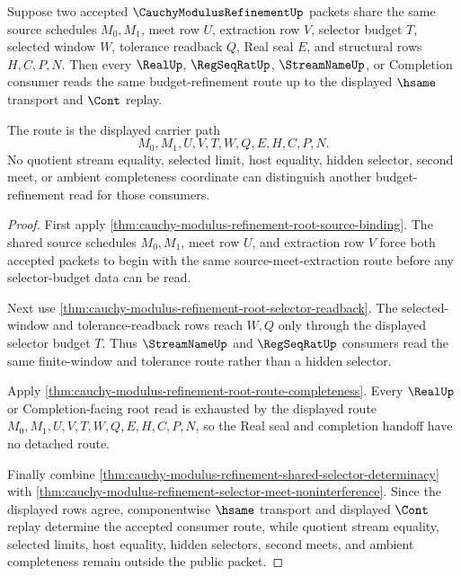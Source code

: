 \begin{theorem}
\label{thm:cauchy-modulus-refinement-budget-naturality}
Suppose two accepted $\CauchyModulusRefinementUp$ packets share the same source schedules $M_0,M_1$, meet row $U$, extraction row $V$, selector budget $T$, selected window $W$, tolerance readback $Q$, Real seal $E$, and structural rows $H,C,P,N$. Then every $\RealUp$, $\RegSeqRatUp$, $\StreamNameUp$, or Completion consumer reads the same budget-refinement route up to the displayed $\hsame$ transport and $\Cont$ replay.

The route is the displayed carrier path
$$
M_0,M_1,U,V,T,W,Q,E,H,C,P,N.
$$
No quotient stream equality, selected limit, host equality, hidden selector, second meet, or ambient completeness coordinate can distinguish another budget-refinement read for those consumers.
\end{theorem}
\begin{proof}
First apply \autoref{thm:cauchy-modulus-refinement-root-source-binding}. The shared source schedules $M_0,M_1$, meet row $U$, and extraction row $V$ force both accepted packets to begin with the same source-meet-extraction route before any selector-budget data can be read.

Next use \autoref{thm:cauchy-modulus-refinement-root-selector-readback}. The selected-window and tolerance-readback rows reach $W,Q$ only through the displayed selector budget $T$. Thus $\StreamNameUp$ and $\RegSeqRatUp$ consumers read the same finite-window and tolerance route rather than a hidden selector.

Apply \autoref{thm:cauchy-modulus-refinement-root-route-completeness}. Every $\RealUp$ or Completion-facing root read is exhausted by the displayed route $M_0,M_1,U,V,T,W,Q,E,H,C,P,N$, so the Real seal and completion handoff have no detached route.

Finally combine \autoref{thm:cauchy-modulus-refinement-shared-selector-determinacy} with \autoref{thm:cauchy-modulus-refinement-selector-meet-noninterference}. Since the displayed rows agree, componentwise $\hsame$ transport and displayed $\Cont$ replay determine the accepted consumer route, while quotient stream equality, selected limits, host equality, hidden selectors, second meets, and ambient completeness remain outside the public packet.
\end{proof}

